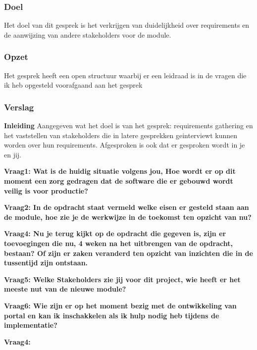 \subsubsection{Doel}
Het doel van dit gesprek is het verkrijgen van duidelijkheid over requirements en de aanwijzing van andere stakeholders voor de module.

\subsubsection{Opzet}
Het gesprek heeft een open structuur waarbij er een leidraad is in de vragen die ik heb opgesteld voorafgaand aan het gesprek

\subsubsection{Verslag}
\textbf{Inleiding}
Aangegeven wat het doel is van het gesprek: requirements gathering en het vaststellen van stakeholders die in latere gesprekken geinterviewt kunnen worden over hun requirements. Afgesproken is ook dat er gesproken wordt in je en jij.

\bigskip

\textbf{Vraag1: Wat is de huidig situatie volgens jou, Hoe wordt er op dit moment een zorg gedragen dat de software die er gebouwd wordt veilig is voor productie?}

\lipsum[01]
\bigskip

\textbf{Vraag2: In de opdracht staat vermeld welke eisen er gesteld staan aan de module, hoe zie je de werkwijze in de toekomst ten opzicht van nu?}

\lipsum[03]
\bigskip

\textbf{Vraag4: Nu je terug kijkt op de opdracht die gegeven is, zijn er toevoegingen die nu, 4 weken na het uitbrengen van de opdracht, bestaan? Of zijn er zaken veranderd ten opzicht van inzichten die in de tussentijd zijn ontstaan.}

\lipsum[05]
\bigskip

\textbf{Vraag5: Welke Stakeholders zie jij voor dit project, wie heeft er het meeste nut van de nieuwe module? }

\lipsum[06]
\bigskip

\textbf{Vraag6: Wie zijn er op het moment bezig met de ontwikkeling van portal en kan ik inschakkelen als ik hulp nodig heb tijdens de implementatie?}

\lipsum[09]
\bigskip

\textbf{Vraag4: }

